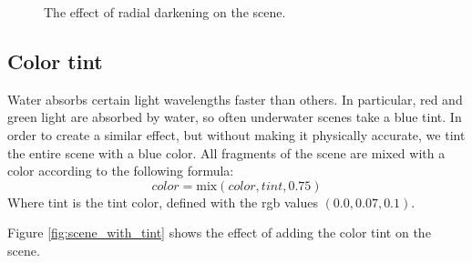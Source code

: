 \documentclass{article}
\begin{document}
\begin{figure}[h]
	\centering
	\hspace{1em}
	\caption{The effect of radial darkening on the scene.}
	\label{fig:scene_with_radial_darkening}
\end{figure}

\subsection{Color tint}
Water absorbs certain light wavelengths faster than others. In particular, red and green light are absorbed by water, so often underwater scenes take a blue tint. In order to create a similar effect, but without making it physically accurate, we tint the entire scene with a blue color.
All fragments of the scene are mixed with a color according to the following formula:
\[ color = \text{mix}\left(color, tint, 0.75\right)\]
Where tint is the tint color, defined with the rgb values $(0.0, 0.07, 0.1)$.

\medskip \par
\noindent
Figure \ref{fig:scene_with_tint} shows the effect of adding the color tint on the scene.
\end{document}
